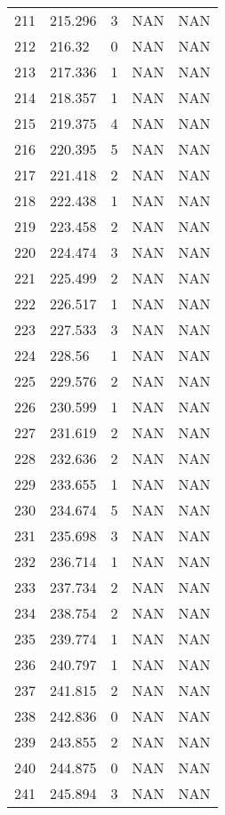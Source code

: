 \documentclass{article}
\begin{document}
\begin{longtable}{@{}lllll@{}}
				211 & 215.296 & 3     & NAN   & NAN   \\
				212 & 216.32  & 0     & NAN   & NAN   \\
				213 & 217.336 & 1     & NAN   & NAN   \\
				214 & 218.357 & 1     & NAN   & NAN   \\
				215 & 219.375 & 4     & NAN   & NAN   \\
				216 & 220.395 & 5     & NAN   & NAN   \\
				217 & 221.418 & 2     & NAN   & NAN   \\
				218 & 222.438 & 1     & NAN   & NAN   \\
				219 & 223.458 & 2     & NAN   & NAN   \\
				220 & 224.474 & 3     & NAN   & NAN   \\
				221 & 225.499 & 2     & NAN   & NAN   \\
				222 & 226.517 & 1     & NAN   & NAN   \\
				223 & 227.533 & 3     & NAN   & NAN   \\
				224 & 228.56  & 1     & NAN   & NAN   \\
				225 & 229.576 & 2     & NAN   & NAN   \\
				226 & 230.599 & 1     & NAN   & NAN   \\
				227 & 231.619 & 2     & NAN   & NAN   \\
				228 & 232.636 & 2     & NAN   & NAN   \\
				229 & 233.655 & 1     & NAN   & NAN   \\
				230 & 234.674 & 5     & NAN   & NAN   \\
				231 & 235.698 & 3     & NAN   & NAN   \\
				232 & 236.714 & 1     & NAN   & NAN   \\
				233 & 237.734 & 2     & NAN   & NAN   \\
				234 & 238.754 & 2     & NAN   & NAN   \\
				235 & 239.774 & 1     & NAN   & NAN   \\
				236 & 240.797 & 1     & NAN   & NAN   \\
				237 & 241.815 & 2     & NAN   & NAN   \\
				238 & 242.836 & 0     & NAN   & NAN   \\
				239 & 243.855 & 2     & NAN   & NAN   \\
				240 & 244.875 & 0     & NAN   & NAN   \\
				241 & 245.894 & 3     & NAN   & NAN   \\

\end{longtable}
\end{document}

